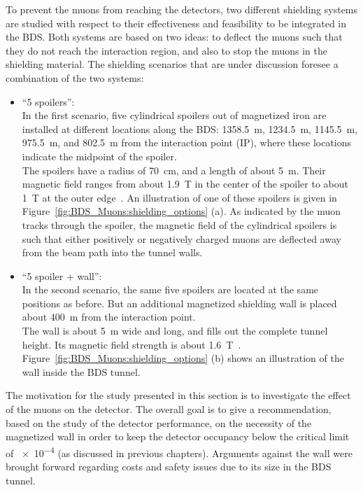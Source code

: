 To prevent the muons from reaching the detectors, two different shielding systems are studied with respect to their effectiveness and feasibility to be integrated in the BDS.
Both systems are based on two ideas: to deflect the muons such that they do not reach the interaction region, and also to stop the muons in the shielding material.
The shielding scenarios that are under discussion foresee a combination of the two systems:
\begin{itemize}
 \item ``5 spoilers'':\\
 In the first scenario, five cylindrical spoilers out of magnetized iron are installed at different locations along the BDS: \SI{1358.5}{\metre}, \SI{1234.5}{\metre}, \SI{1145.5}{\metre}, \SI{975.5}{\metre}, and \SI{802.5}{\metre} from the interaction point (IP), where these locations indicate the midpoint of the spoiler.
 \\The spoilers have a radius of \SI{70}{\centi\meter}, and a length of about \SI{5}{\meter}.
 Their magnetic field ranges from about \SI{1.9}{\tesla} in the center of the spoiler to about \SI{1}{\tesla} at the outer edge~\cite{MuonShielding,Lewis}.
 An illustration of one of these spoilers is given in Figure~\ref{fig:BDS_Muons:shielding_options} (a).
 As indicated by the muon tracks through the spoiler, the magnetic field of the cylindrical spoilers is such that either positively or negatively charged muons are deflected away from the beam path into the tunnel walls.
 \item ``5 spoiler + wall'':\\
 In the second scenario, the same five spoilers are located at the same positions as before.
 But an additional magnetized shielding wall is placed about \SI{400}{\meter} from the interaction point.
 \\The wall is about \SI{5}{\meter} wide and long, and fills out the complete tunnel height.
 Its magnetic field strength is about \SI{1.6}{\tesla}~\cite{MuonShielding,Lewis}.
 Figure~\ref{fig:BDS_Muons:shielding_options} (b) shows an illustration of the wall inside the BDS tunnel.
\end{itemize}
The motivation for the study presented in this section is to investigate the effect of the muons on the \sid detector.
The overall goal is to give a recommendation, based on the study of the detector performance, on the necessity of the magnetized wall in order to keep the detector occupancy below the critical limit of \num{e-4} (as discussed in previous chapters).
Arguments against the wall were brought forward regarding costs and safety issues due to its size in the BDS tunnel.
